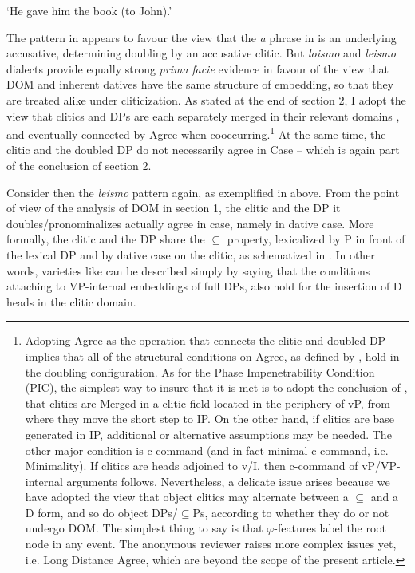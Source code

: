 \documentclass[output=paper]{langscibook}
\begin{document}
‘He gave him the book (to John).’        

The pattern in  appears to favour the view that the \textit{a} phrase in  is an underlying accusative, determining doubling by an accusative clitic. But \textit{loismo} and \textit{leismo} dialects provide equally strong \textit{prima} \textit{facie} evidence in favour of the view that DOM and inherent datives have the same structure of embedding, so that they are treated alike under cliticization. As stated at the end of section 2, I adopt the view that clitics and DPs are each separately merged in their relevant domains \citep{Sportiche1996}, and eventually connected by  Agree when cooccurring.\footnote{Adopting Agree as the operation that connects the clitic and doubled DP implies that all of the structural conditions on Agree, as defined by \citet{Chomsky2000}, hold in the doubling configuration. As for the Phase Impenetrability Condition (PIC), the simplest way to insure that it is met is to adopt the conclusion of \citet{Sportiche1996}, that clitics are Merged in a clitic field located in the periphery of vP, from where they move the short step to IP. On the other hand, if clitics are base generated in IP, additional or alternative assumptions may be needed. The other major condition is c-command (and in fact minimal c-command, i.e. Minimality). If clitics are heads adjoined to v/I, then c-command of vP/VP-internal arguments follows. Nevertheless, a delicate issue arises because we have adopted the view that object clitics may alternate between a \textrm{${\subseteq}$} and a D form, and so do object DPs/\textrm{${\subseteq}$}Ps, according to whether they do or not undergo DOM.  The simplest thing to say is that $\varphi $-features label the root node in any event. The anonymous reviewer raises more complex issues yet, i.e. Long Distance Agree, which are beyond the scope of the present article.}{} At the same time, the clitic and the doubled DP do not necessarily agree in Case – which is again part of the conclusion of section 2. 

Consider then the \textit{leismo} pattern again, as exemplified in  above. From the point of view of the analysis of DOM in section 1, the clitic and the DP it doubles/pronominalizes actually agree in case, namely in dative case. More formally, the clitic and the DP share the ${\subseteq}$ property, lexicalized by P in front of the lexical DP and by dative case on the clitic, as schematized in . In other words, varieties like  can be described simply by saying that the conditions attaching to VP-internal embeddings of full DPs, also hold for the insertion of D heads in the clitic domain.  
\end{document}
